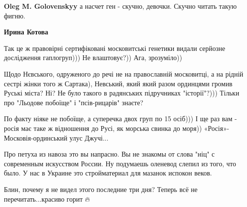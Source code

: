 \begin{itemize}
\begin{itemize}
 
\textbf{Oleg M. Golovenskyy} а насчет ген - скучно, девочки. Скучно читать такую фигню.

 
\textbf{Ирина Котова} 

Так це ж правовірні сертифіковані московитські генетики видали серйозне
дослідження гаплогруп))) Не влаштовує?)) Ага, зрозуміло)) 

Щодо Нєвського, одруженого до речі не на православній московитці, а на рідній
сестрі жінки того ж Сартака), Невський, який який разом ординцями громив Руські
міста? Ні? Не було такого в радянських підручниках "історії"?))) Тільки про
"Льодове побоїще" і "псів-рицарів" знаєте? 

По факту ніяке не побоїще, а суперечка двох груп по 15 осіб))) І ще раз вам -
росія має таке ж відношення до Русі, як морська свинка до моря))
«Росія»-Московія-ординський улус Джучі...

\end{itemize}

 
Про петуха из навоза это вы напрасно. Вы не знакомы от слова "ніц" с современным искусством России. Ну подумаешь оленевод слепил из того, что было. У нас в Украине это стройматериал для мазанок испокон веков.

 
Блин, почему я не видел этого последние три дня? Теперь всё не перечитать...красиво горит 🔥

 


\end{itemize}
